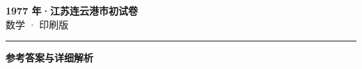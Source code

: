 \documentclass[zihao=5, a4paper]{ctexart}
\begin{document}
\begin{center}
  {\Large\bfseries 1977 年·江苏连云港市初试卷}\\[4pt]
  {\large 数学 · 印刷版}
\end{center}
\medskip
{}

\par\bigskip\hrule\bigskip
{}
\begin{center}{\large\bfseries 参考答案与详细解析}\end{center}
\smallskip

\end{document}
